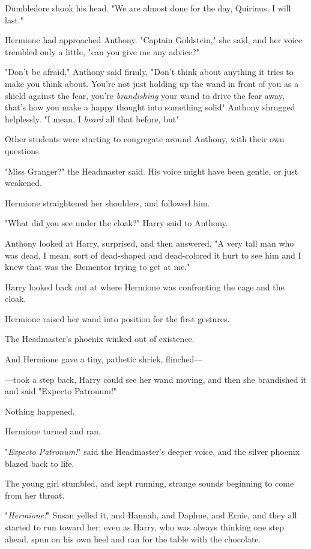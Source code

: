 Dumbledore shook his head. "We are almost done for the day, Quirinus. I will
last."

Hermione had approached Anthony. "Captain Goldstein," she said, and her voice
trembled only a little, "can you give me any advice?"

"Don't be afraid," Anthony said firmly. "Don't think about anything it tries to
make you think about. You're not just holding up the wand in front of you as a
shield against the fear, you're \emph{brandishing} your wand to drive the fear
away, that's how you make a happy thought into something solid{\el}" Anthony
shrugged helplessly. "I mean, I \emph{heard} all that before, but{\el}"

Other students were starting to congregate around Anthony, with their own
questions.

"Miss Granger?" the Headmaster said. His voice might have been gentle, or just
weakened.

Hermione straightened her shoulders, and followed him.

"What did you see under the cloak?" Harry said to Anthony.

Anthony looked at Harry, surprised, and then answered, "A very tall man who was
dead, I mean, sort of dead-shaped and dead-colored{\el} it hurt to see him
and I knew that was the Dementor trying to get at me."

Harry looked back out at where Hermione was confronting the cage and the cloak.

Hermione raised her wand into position for the first gestures.

The Headmaster's phoenix winked out of existence.

And Hermione gave a tiny, pathetic shriek, flinched---

---took a step back, Harry could see her wand moving, and then she brandished
it and said "Expecto Patronum!"

Nothing happened.

Hermione turned and ran.

"\emph{Expecto Patronum!}" said the Headmaster's deeper voice, and the silver
phoenix blazed back to life.

The young girl stumbled, and kept running, strange sounds beginning to come
from her throat.

"\emph{Hermione!}" Susan yelled it, and Hannah, and Daphne, and Ernie, and they
all started to run toward her; even as Harry, who was always thinking one step
ahead, spun on his own heel and ran for the table with the chocolate.

